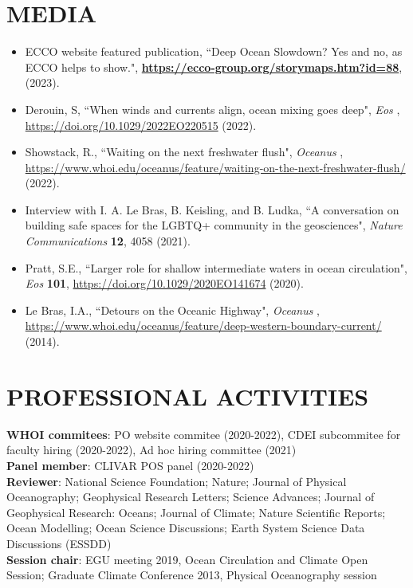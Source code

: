 \documentclass[paper=letter,fontsize=11pt]{scrartcl} %
\newcommand{\NewPart}[2]{\section*{\uppercase{#1} #2}}
\newcommand{\ShortEntry}[2]{\normalsize \noindent \textbf{#1}: #2 \\ }
\newcommand{\PaperEntry}[6]{
		\noindent #1, ``#2", \textit{#3} \textbf{#4}, #5 (#6).}
\begin{document}
\NewPart{Media}{}

\begin{itemize}

\item \PaperEntry{ECCO website featured publication}{Deep Ocean Slowdown? Yes and no, as ECCO helps to show.}{}{\url{https://ecco-group.org/storymaps.htm?id=88}}{}{2023}

\item \PaperEntry{Derouin, S}{When winds and currents align, ocean mixing goes deep}{Eos}{}{\url{https://doi.org/10.1029/2022EO220515}}{2022}

\item \PaperEntry{Showstack, R.}{Waiting on the next freshwater flush}{Oceanus}{}{\url{https://www.whoi.edu/oceanus/feature/waiting-on-the-next-freshwater-flush/}}{2022}

\item \PaperEntry{Interview with I. A. Le Bras, B. Keisling, and B. Ludka}{A conversation on building safe spaces for the LGBTQ+ community in the geosciences}{Nature Communications}{12}{4058}{2021}

\item \PaperEntry{Pratt, S.E.}{Larger role for shallow intermediate waters in ocean circulation}{Eos}{101}{\url{ https://doi.org/10.1029/2020EO141674}}{2020}

\item \PaperEntry{Le Bras, I.A.}{Detours on the Oceanic Highway}{Oceanus}{}{\url{ https://www.whoi.edu/oceanus/feature/deep-western-boundary-current/}}{2014}
\end{itemize}

\NewPart{Professional Activities}{}

\ShortEntry{WHOI commitees}{PO website commitee (2020-2022), CDEI subcommitee for faculty hiring (2020-2022), Ad hoc hiring committee (2021)}

\ShortEntry{Panel member}{CLIVAR POS panel (2020-2022)}

\ShortEntry{Reviewer}{National Science Foundation; Nature; Journal of Physical Oceanography; Geophysical Research Letters; Science Advances; Journal of Geophysical Research: Oceans; Journal of Climate; Nature Scientific Reports; Ocean Modelling; Ocean Science Discussions; Earth System Science Data Discussions (ESSDD)}

\ShortEntry{Session chair}{EGU meeting 2019, Ocean Circulation and Climate Open Session; Graduate Climate Conference 2013, Physical Oceanography session}
\end{document}
